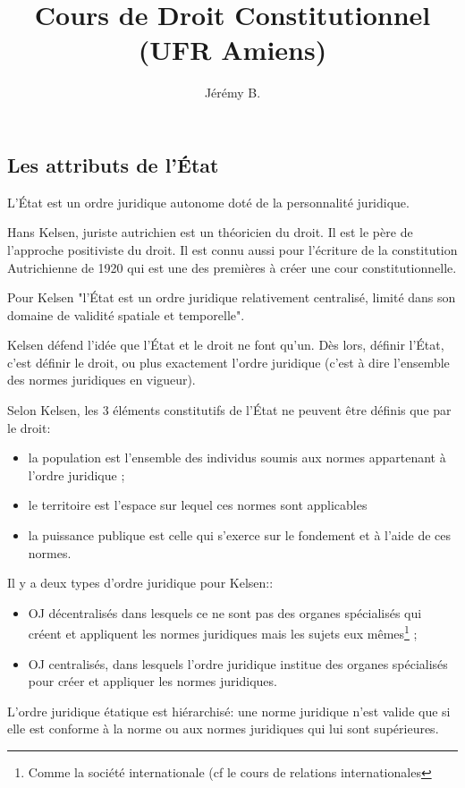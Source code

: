 \documentclass[12pt, a4paper, openany]{book}
\author{Jérémy B.}
\date{}
\title{Cours de Droit Constitutionnel (UFR Amiens)}
\begin{document}
\maketitle

\subsection{Les attributs de l'État}

L'État est un ordre juridique autonome doté de la personnalité juridique.


Hans Kelsen, juriste autrichien est un théoricien du droit. Il est le père de l'approche positiviste du droit. Il est connu aussi pour l'écriture de la constitution Autrichienne de 1920 qui est une des premières à créer une cour constitutionnelle. 

Pour Kelsen "l'État est un ordre juridique relativement centralisé, limité dans son domaine de validité spatiale et temporelle".

Kelsen défend l'idée que l'État et le droit ne font qu'un. Dès lors, définir l'État, c'est définir le droit, ou plus exactement l'ordre juridique (c'est à dire l'ensemble des normes juridiques en vigueur).

Selon Kelsen, les 3 éléments constitutifs de l'État ne peuvent être définis que par le droit:
\begin{itemize}
\item la population est l'ensemble des individus soumis aux normes appartenant à l'ordre juridique ;
\item le territoire est l'espace sur lequel ces normes sont applicables
\item la puissance publique est celle qui s'exerce sur le fondement et à l'aide de ces normes.
\end{itemize}

Il y a deux types d'ordre juridique pour Kelsen::

\begin{itemize}
\item OJ décentralisés dans lesquels ce ne sont pas des organes spécialisés qui créent et appliquent les normes juridiques mais les sujets eux mêmes\footnote{Comme la société internationale (cf le cours de relations internationales} ;
\item OJ centralisés, dans lesquels l'ordre juridique institue des organes spécialisés pour créer et appliquer les normes juridiques.
\end{itemize}

L'ordre juridique étatique est hiérarchisé: une norme juridique n'est valide que si elle est conforme à la norme ou aux normes juridiques qui lui sont supérieures.
\end{document}
